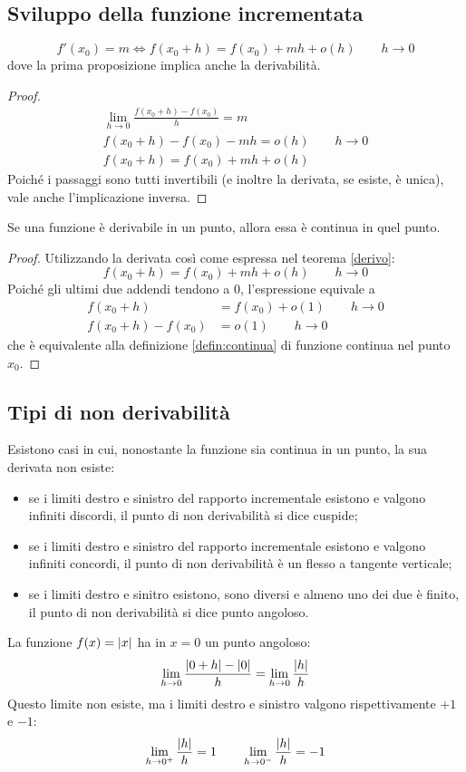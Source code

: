 \subsection{Sviluppo della funzione incrementata}
\begin{teor}
	\label{derivo}
	\[
		f'(x_0)=m \iff f(x_0+h)=f(x_0)+mh+o(h)\qquad h\to0
	\]
	dove la prima proposizione implica anche la derivabilità.
\end{teor}
\begin{proof}
	\begin{gather*}
		\lim_{h\to0} \frac{f(x_0+h)-f(x_0)}{h}=m\\
		f(x_0+h)-f(x_0)-mh=o(h)\qquad h\to0\\
		f(x_0+h)=f(x_0)+mh+o(h)
	\end{gather*}
	Poiché i passaggi sono tutti invertibili (e inoltre la derivata, se esiste, è unica), vale anche l'implicazione inversa.
\end{proof}

\begin{corol}
	Se una funzione è derivabile in un punto, allora essa è continua in quel punto.
\end{corol}
\begin{proof}
	Utilizzando la derivata così come espressa nel teorema \ref{derivo}:
	\[
		f(x_0+h)=f(x_0)+mh+o(h)\qquad h\to0
	\]
	Poiché gli ultimi due addendi tendono a $0$, l'espressione equivale a
	\begin{align*}
		f(x_0+h)          & = f(x_0)+o(1)\qquad h\to0 \\
		f(x_0+h) - f(x_0) & = o(1)\qquad h\to0
	\end{align*}
	che è equivalente alla definizione \vref{defin:continua} di funzione continua nel punto $x_0$.
\end{proof}


\subsection{Tipi di non derivabilità}
Esistono casi in cui, nonostante la funzione sia continua in un punto, la sua derivata non esiste:
\begin{itemize}
	\item se i limiti destro e sinistro del rapporto incrementale esistono e valgono infiniti discordi, il punto di non derivabilità si dice cuspide;
	\item se i limiti destro e sinistro del rapporto incrementale esistono e valgono infiniti concordi, il punto di non derivabilità è un flesso a tangente verticale;
	\item se i limiti destro e sinitro esistono, sono diversi e almeno uno dei due è finito, il punto di non derivabilità si dice punto angoloso.
\end{itemize}
\begin{examp}
	La funzione $f(x)=\left\lvert x \right\rvert$ ha in $x=0$ un punto angoloso:
	\[
		\lim_{h\to 0} \frac{\left\lvert 0+h \right\rvert-\left\lvert 0 \right\rvert}{h} = \lim_{h\to 0} \frac{\left\lvert h \right\rvert}{h}
	\]
	Questo limite non esiste, ma i limiti destro e sinistro valgono rispettivamente $+1$ e $-1$:
	\[
		\lim_{h\to 0^+} \frac{\left\lvert h \right\rvert}{h}=1\qquad\lim_{h\to 0^-} \frac{\left\lvert h \right\rvert}{h}=-1
	\]
\end{examp}

